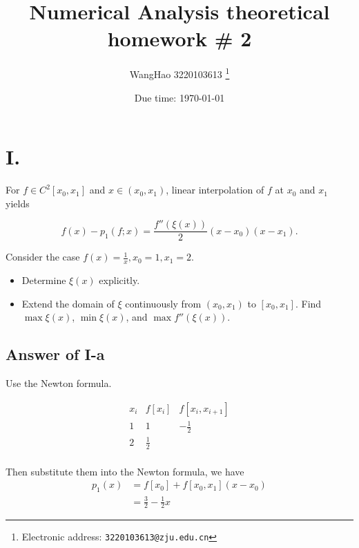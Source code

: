 \documentclass[a4paper]{article}
\begin{document}
\title{Numerical Analysis theoretical homework \# 2}

\author{WangHao 3220103613
  \thanks{Electronic address: \texttt{3220103613@zju.edu.cn}}}


\date{Due time: \today}

\maketitle



\section*{I.}
For $f \in C^2[x_0,x_1]$ and $x \in (x_0,x_1)$, 
linear interpolation of $f$ at $x_0$ and $x_1$ yields

$$
f(x) - p_1(f;x) = \frac{f''(\xi(x))}{2} (x - x_0)(x-x_1).
$$

Consider the case $f(x) = \frac{1}{x}, x_0 = 1, x_1 = 2$.


\begin{itemize}
    \item Determine $\xi(x)$ explicitly.
    \item Extend the domain of $\xi$ continuously from $(x_0,x_1)$ to $[x_0,x_1].$ 
    Find $\max \xi(x)$, $\min \xi(x)$, and $\max f''(\xi(x))$.
\end{itemize}

\subsection*{Answer of I-a}

Use the Newton formula.

$$
\begin{array}{c|cc}
x_i & f[x_i] & f[x_i, x_{i+1}] \\
\hline
1 & 1 & -\frac{1}{2} \\
2 & \frac{1}{2} \\
\end{array}
$$

Then substitute them into the Newton formula, we have
\begin{align*}
  p_1(x)&=f[x_0]+f[x_0,x_1](x-x_0)\\
  &=\frac{3}{2}-\frac{1}{2}x
\end{align*}
\end{document}

